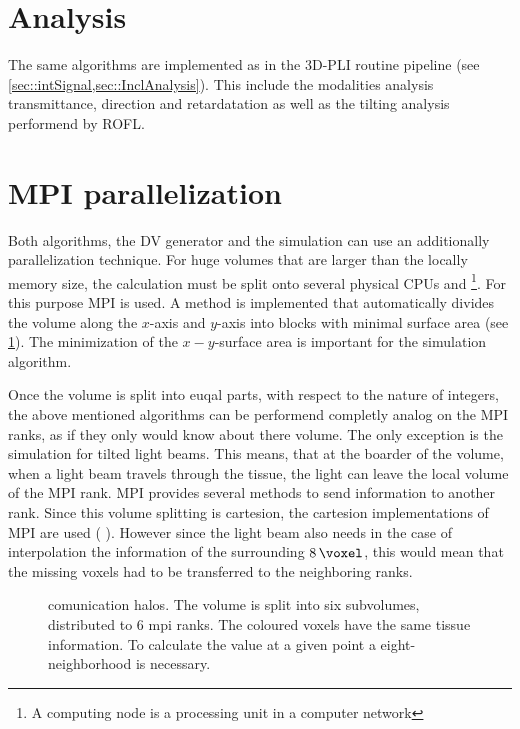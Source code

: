 \section{Analysis}
%
The same algorithms are implemented as in the \ac{3D-PLI} routine pipeline (see \cref{sec::intSignal,sec::InclAnalysis}).
This include the modalities analysis transmittance, direction and retardatation as well as the tilting analysis performend by \ac{ROFL}.
%
%
%
\section{MPI parallelization}\label{sec:mpiSim}
%
Both algorithms, the DV generator and the simulation can use an additionally parallelization technique.
%
For huge volumes that are larger than the locally memory size, the calculation must be split onto several physical \acp{CPU} and \footnote{A computing node is a processing unit in a computer network}.
For this purpose  \ac{MPI} is used.
A method is implemented that automatically divides the volume along the $x$-axis and $y$-axis into blocks with minimal surface area (see \cref{fig:com_halo}).
The minimization of the $x-y$-surface area is important for the simulation algorithm.
\par
Once the volume is split into euqal parts, with respect to the nature of integers, the above mentioned algorithms can be performend completly analog on the \ac{MPI} ranks, as if they only would know about there volume.
The only exception is the simulation for tilted light beams.
This means, that at the boarder of the volume, when a light beam travels through the tissue, the light can leave the local volume of the \ac{MPI} rank.
\ac{MPI} provides several methods to send information to another rank.
Since this volume splitting is cartesion, the cartesion implementations of \ac{MPI} are used (\eg{} ).
However since the light beam also needs in the case of interpolation the information of the surrounding $\SI{8}{\voxel}$, this would mean that the missing voxels had to be transferred to the neighboring ranks.
%
\begin{figure}[!t]
\centering
\setlength{\tikzwidth}{0.85\textwidth}
\caption{comunication halos. The volume is split into six subvolumes, distributed to 6 mpi ranks. The coloured voxels have the same tissue information.  To calculate the value at a given point a eight-neighborhood is necessary.}
\label{fig:com_halo}
\end{figure}
